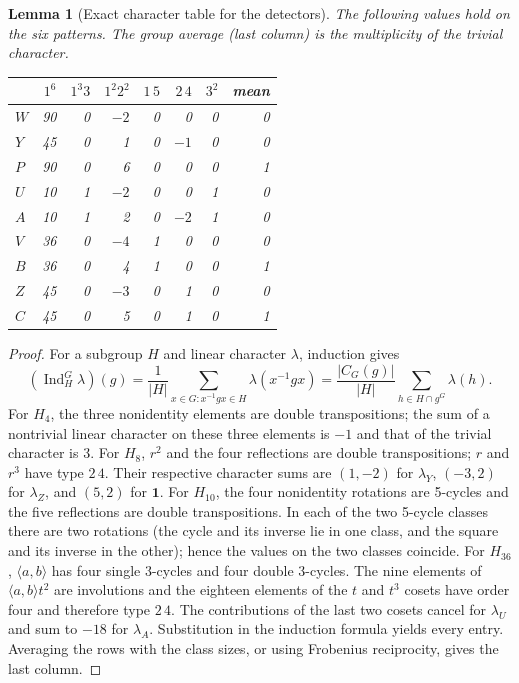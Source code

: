 \documentclass[11pt,letterpaper]{article}
\newtheorem{lemma}[theorem]{Lemma}
\theoremstyle{remark}\newtheorem{remark}[theorem]{Remark}
\newcommand{\Ind}{\operatorname{Ind}}\newcommand{\Res}{\operatorname{Res}}\newcommand{\ord}{\operatorname{ord}}\newcommand{\reg}{\operatorname{reg}}\newcommand{\Gal}{\operatorname{Gal}}\newcommand{\Frob}{\operatorname{Frob}}\newcommand{\one}{\mathbf1}\newcommand{\RH}{\mathrm{RH}}
\begin{document}
\begin{lemma}[Exact character table for the detectors]\label{lem:rows}
The following values hold on the six patterns. The group average (last column) is the multiplicity of the trivial character.
\begin{center}
\begin{tabular}{@{}lrrrrrrr@{}}
\toprule
 & $1^6$ & $1^3 3$ & $1^2 2^2$ & $1\,5$ & $2\,4$ & $3^2$ & mean\\\midrule
$W$&90&0&$-2$&0&0&0&0\\
$Y$&45&0&1&0&$-1$&0&0\\
$P$&90&0&6&0&0&0&1\\\midrule
$U$&10&1&$-2$&0&0&1&0\\
$A$&10&1&2&0&$-2$&1&0\\
$V$&36&0&$-4$&1&0&0&0\\
$B$&36&0&4&1&0&0&1\\
$Z$&45&0&$-3$&0&1&0&0\\
$C$&45&0&5&0&1&0&1\\\bottomrule
\end{tabular}
\end{center}
\end{lemma}
\begin{proof}
For a subgroup $H$ and linear character $\lambda$, induction gives
\[
 (\Ind_H^G\lambda)(g)=\frac1{|H|}\sum_{x\in G:x^{-1}gx\in H}\lambda(x^{-1}gx)
 =\frac{|C_G(g)|}{|H|}\sum_{h\in H\cap g^G}\lambda(h).
\]
For $H_4$, the three nonidentity elements are double transpositions; the sum of a nontrivial linear character on these three elements is $-1$ and that of the trivial character is 3. For $H_8$, $r^2$ and the four reflections are double transpositions; $r$ and $r^3$ have type $2\,4$. Their respective character sums are $(1,-2)$ for $\lambda_Y$, $(-3,2)$ for $\lambda_Z$, and $(5,2)$ for $\one$. For $H_{10}$, the four nonidentity rotations are 5-cycles and the five reflections are double transpositions. In each of the two 5-cycle classes there are two rotations (the cycle and its inverse lie in one class, and the square and its inverse in the other); hence the values on the two classes coincide. For $H_{36}$, $\langle a,b\rangle$ has four single 3-cycles and four double 3-cycles. The nine elements of $\langle a,b\rangle t^2$ are involutions and the eighteen elements of the $t$ and $t^3$ cosets have order four and therefore type $2\,4$. The contributions of the last two cosets cancel for $\lambda_U$ and sum to $-18$ for $\lambda_A$. Substitution in the induction formula yields every entry. Averaging the rows with the class sizes, or using Frobenius reciprocity, gives the last column.
\end{proof}
\end{document}
